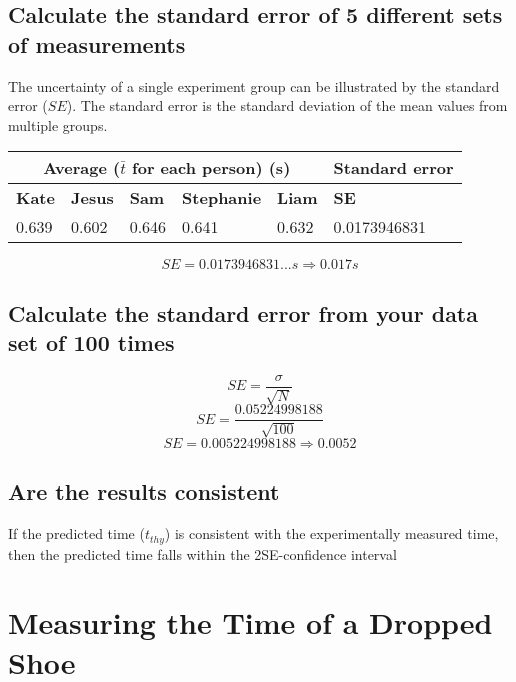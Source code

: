 \documentclass[11pt, letterpaper, includehead]{article}
\begin{document}
\subsection{Calculate the standard error of 5 different sets of measurements} %
The uncertainty of a single experiment group can be illustrated by the standard
error ($SE$). The standard error is the standard deviation of the mean values
from multiple groups.

\begin{center}
  \begin{tabular}{|   m{2cm}  |  m{2cm}  |  m{2cm}  |  m{2cm}  |  m{2cm}  |  m{2.5cm}  | }
    \hline
    \multicolumn{5}{|c|}{\textbf{Average ($\bar{t}$ for each person) (s)}} & \multicolumn{1}{c|}{\textbf{Standard error}}\\
    
    \hline
    \textbf{Kate} & \textbf{Jesus} & \textbf{Sam} & \textbf{Stephanie} & \textbf{Liam} & \textbf{SE}  \\
    \hline
    0.639         & 0.602          & 0.646        & 0.641              & 0.632         & 0.0173946831 \\  %
    \hline
  \end{tabular}
\end{center}

$$SE = 0.0173946831...s \Rightarrow \boxed{0.017s}$$

\subsection{Calculate the standard error from your data set of 100 times} %
$$SE = \frac{\sigma}{\sqrt{N}}$$
$$SE = \frac{0.05224998188}{\sqrt{100}}$$
$$SE = 0.005224998188 \Rightarrow \boxed{0.0052}$$\pagebreak 

\subsection{Are the results consistent}
If the predicted time ($t_{thy}$) is consistent with the experimentally 
measured time, then the predicted time falls within the 2SE-confidence interval

\section{Measuring the Time of a Dropped Shoe}
\end{document}
